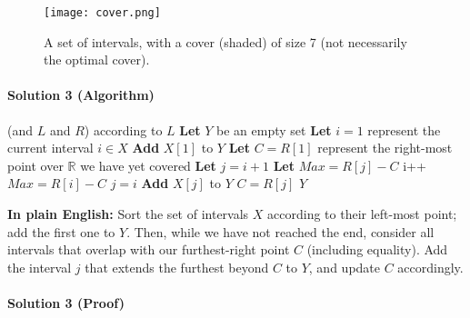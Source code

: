 \documentclass[11pt]{article}
\begin{document}
\begin{figure}[h]
\centering
\texttt{[image: cover.png]}
\caption{A set of intervals, with a cover (shaded) of size 7 (not necessarily the optimal cover).}
\end{figure}

\paragraph{Solution 3 (Algorithm)}

\begin{algorithmic}[1]
    \State {} (and $L$ and $R$) according to $L$ 
    \State \textbf{Let} $Y$ be an empty set
    \State \textbf{Let} $i = 1$ represent the current interval $i \in X$
    \State \textbf{Add} $X[1]$ to $Y$
    \State \textbf{Let} $C = R[1]$ represent the right-most point over $\mathbb{R}$ we have yet covered
        \State \textbf{Let} $j = i + 1$ 
        \State \textbf{Let} $Max = R[j] - C$ 
            \State i++
                \State $Max = R[i] - C$
                \State $j = i$
            \EndIf
        \EndWhile
        \State \textbf{Add} $X[j]$ to $Y$
        \State $C = R[j]$ 
    \EndWhile
    \State \Return $Y$
    \EndProcedure
\end{algorithmic}

\textbf{In plain English:} Sort the set of intervals $X$ according to their left-most point; add the first one to $Y$. Then, while we have not reached the end, consider all intervals that overlap with our furthest-right point $C$ (including equality). Add the interval $j$ that extends the furthest beyond $C$ to $Y$, and update $C$ accordingly.

\paragraph{Solution 3 (Proof)}
\end{document}
